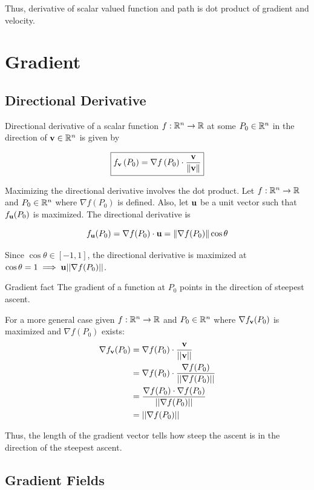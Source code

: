 Thus, derivative of scalar valued function and path is dot product of gradient and velocity.

\section{Gradient}

\subsection{Directional Derivative}

Directional derivative of a scalar function $f:\mathbb{R}^n\to \mathbb{R}$ at some $P_0\in\mathbb{R}^n$ in the direction of $\textbf{v}\in\mathbb{R}^n$ is given by

\[\boxed{f_{\textbf{v}}\left(P_{0}\right)=\nabla f\left(P_{0}\right) \cdot \frac{\textbf{v}}{\|\textbf{v}\|}}\]

Maximizing the directional derivative involves the dot product. Let $f:\mathbb{R}^n\to \mathbb{R}$ and $P_0\in\mathbb{R}^n$ where $\nabla f(P_0)$ is defined.
Also, let $\textbf{u}$ be a unit vector such that $f_{\textbf{u}}(P_0)$ is maximized. The directional derivative is

\[f_{\textbf u}(P_0)=\nabla f(P_0)\cdot \textbf u=\|\nabla f(P_0)\|\cos \theta\]

Since $\cos\theta \in [-1,1]$, the directional derivative is maximized at $\cos\theta = 1\implies \textbf{u}||\nabla f(P_0)||$.

\begin{mybox}{Gradient fact}
The gradient of a function at $P_0$ points in the direction of steepest ascent.
\end{mybox}

For a more general case given $f:\mathbb{R}^n\to \mathbb{R}$ and $P_0\in\mathbb{R}^n$ where $\nabla f_{\textbf{v}}(P_0)$ is maximized and $\nabla f(P_0)$ exists:
\begin{align*}
    \nabla f_{\textbf{v}}(P_0)&=\nabla f(P_0) \cdot \frac{\textbf{v}}{||\textbf{v}||}\\
    &=\nabla f(P_0) \cdot \frac{\nabla f(P_0)}{||\nabla f(P_0)||}\\
    &=\frac{\nabla f(P_0)\cdot \nabla f(P_0)}{||\nabla f(P_0)||}\\
    &=||\nabla f(P_0)||
\end{align*}

Thus, the length of the gradient vector tells how steep the ascent is in the direction of the steepest ascent.

\subsection{Gradient Fields}

